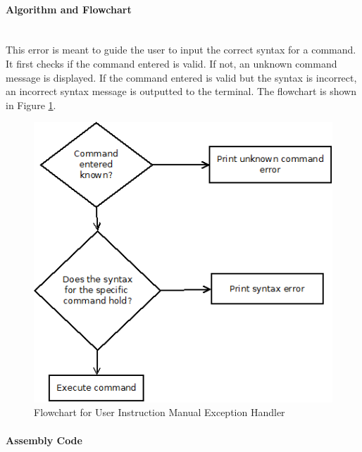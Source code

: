 \documentclass[12pt]{article}
\begin{document}
			\paragraph{Algorithm and Flowchart}~\\
			This error is meant to guide the user to input the correct syntax for a command. It first checks if the command entered is valid. If not, an unknown command message is displayed. If the command entered is valid but the syntax is incorrect, an incorrect syntax message is outputted to the terminal. The flowchart is shown in Figure \ref{fig:UserInst}.
			
		
\begin{figure}[H]
\centering
\includegraphics[width=0.7\linewidth]{UserInst}
\caption{Flowchart for User Instruction Manual Exception Handler}
\label{fig:UserInst}
\end{figure}
			\paragraph{Assembly Code}~\\
			
			
			
			
			
\end{document}
